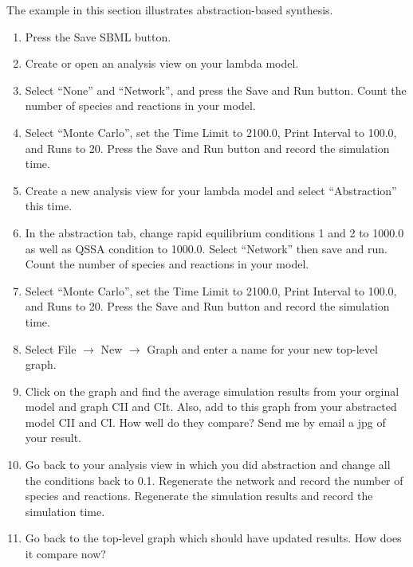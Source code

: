 \documentclass[titlepage,11pt]{article}
\begin{document}
The example in this section illustrates abstraction-based synthesis. 
\begin{enumerate}
\item Press the Save SBML button.

\item Create or open an analysis view on your lambda model.

\item Select ``None'' and ``Network'', and press the Save and Run button. 
      Count the number of species and reactions in your model.  

\item Select ``Monte Carlo'', set the Time Limit to 2100.0, Print Interval to
      100.0, and Runs to 20.  Press the Save and Run button and record the
      simulation time.

\item Create a new analysis view for your lambda model and 
      select  ``Abstraction'' this time.  

\item In the abstraction tab, change rapid equilibrium conditions 1 and 2 
      to 1000.0 as well as QSSA condition to 1000.0.  Select ``Network'' then 
      save and run.  Count the number of species and reactions in your model.

\item Select ``Monte Carlo'', set the Time Limit to 2100.0, Print Interval to
      100.0, and Runs to 20.  Press the Save and Run button and record the
      simulation time.

\item Select File $\rightarrow$ New $\rightarrow$ Graph and enter a name for
      your new top-level graph.

\item Click on the graph and find the average simulation results from your
      orginal model and graph CII and CIt.  Also, add to this graph from
      your abstracted model CII and CI.  How well do they compare?  
      Send me by email a jpg of your result.

\item Go back to your analysis view in which you did abstraction and change
      all the conditions back to 0.1.  Regenerate the network and record the
      number of species and reactions.  Regenerate the simulation results and
      record the simulation time.  

\item Go back to the top-level graph which should have updated results.  
      How does it compare now?
\end{enumerate}
\end{document}
